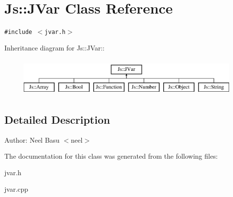 \section{Js::JVar Class Reference}
\label{classJs_1_1JVar}
{\tt \#include $<$jvar.h$>$}

Inheritance diagram for Js::JVar::\begin{figure}[H]
\begin{center}
\leavevmode
\includegraphics[height=2cm]{classJs_1_1JVar}
\end{center}
\end{figure}


\subsection{Detailed Description}
\begin{Desc}
\item[Author:]Neel Basu $<$neel$>$ \end{Desc}


The documentation for this class was generated from the following files:\begin{CompactItemize}
\item 
jvar.h\item 
jvar.cpp\end{CompactItemize}
